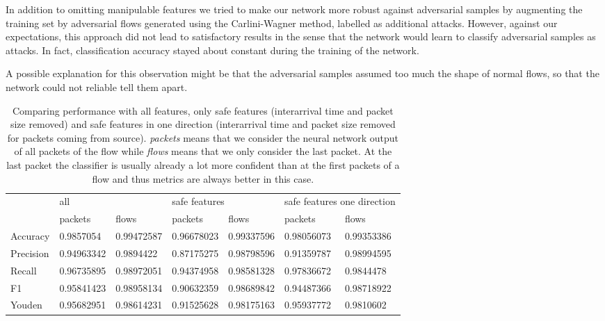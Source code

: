 \documentclass[sigconf,nonacm]{acmart}
\begin{document}
In addition to omitting manipulable features we tried to make our network more robust against adversarial samples by augmenting the training set by adversarial flows generated using the Carlini-Wagner method, labelled as additional attacks. However, against our expectations, this approach did not lead to satisfactory results in the sense that the network would learn to classify adversarial samples as attacks. In fact, classification accuracy stayed about constant during the training of the network.

A possible explanation for this observation might be that the adversarial samples assumed too much the shape of normal flows, so that the network could not reliable tell them apart.

\begin{table}
\caption{Comparing performance with all features, only safe features (interarrival time and packet size removed) and safe features in one direction (interarrival time and packet size removed for packets coming from source). \textit{packets} means that we consider the neural network output of all packets of the flow while \textit{flows} means that we only consider the last packet. At the last packet the classifier is usually already a lot more confident than at the first packets of a flow and thus metrics are always better in this case.}  \label{tab:performance_results_no_manipulable}
\newcommand{\cmidrulespace}{6pt}
\begin{tabular}{l l l l l l l} \toprule
& \multicolumn{2}{l}{all} & \multicolumn{2}{l}{safe features} & \multicolumn{2}{l}{safe features one direction} \\
\cmidrule(r){2-3} \cmidrule(lr){4-5} \cmidrule(l){6-7}
& packets & flows & packets & flows & packets & flows \\
\midrule
Accuracy & 0.9857054 & 0.99472587 & 0.96678023 & 0.99337596 & 0.98056073 & 0.99353386 \\
Precision & 0.94963342 & 0.9894422 & 0.87175275 & 0.98798596 & 0.91359787 & 0.98994595 \\
Recall & 0.96735895 & 0.98972051 & 0.94374958 & 0.98581328 & 0.97836672 & 0.9844478 \\
F1 & 0.95841423 & 0.98958134 & 0.90632359 & 0.98689842 & 0.94487366 & 0.98718922 \\
Youden & 0.95682951 & 0.98614231 & 0.91525628 & 0.98175163 & 0.95937772 & 0.9810602 \\
\bottomrule
\end{tabular}
\end{table}
\end{document}

